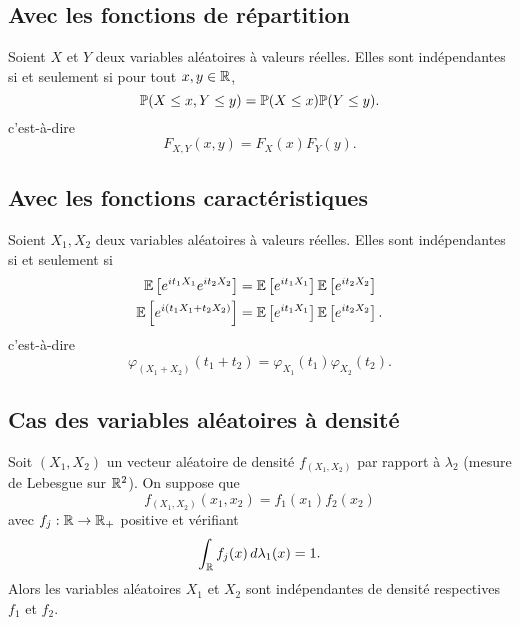 \subsection*{Avec les fonctions de répartition}\label{subsection:fonctions_de_repartition}
\setcounter{subsection}{2}
Soient \(X\) et \(Y\) deux variables aléatoires à valeurs réelles. Elles sont indépendantes
si et seulement si pour tout \(x,y\in\mathbb{R}\),
\begin{equation*}
    \mathbb{P}(X\leq x, Y\leq y) = \mathbb{P}(X\leq x)\mathbb{P}(Y\leq y).
\end{equation*}
c'est-à-dire
\begin{equation*}
    F_{X,Y}(x,y) = F_X(x)F_Y(y).
\end{equation*}

\subsection*{Avec les fonctions caractéristiques}\label{subsection:fonctions_caracteristiques}
\setcounter{subsection}{3}
Soient \(X_1, X_2\) deux variables aléatoires à valeurs réelles. Elles sont indépendantes
si et seulement si
\begin{equation*}
    \begin{aligned}
        \mathbb{E}\left[ e^{it_1X_1}e^{it_2X_2} \right] &= \mathbb{E}\left[ e^{it_1X_1} \right]\mathbb{E}\left[ e^{it_2X_2} \right]\\
        \mathbb{E}\left[ e^{i(t_1X_1+t_2X_2)} \right] &= \mathbb{E}\left[ e^{it_1X_1} \right]\mathbb{E}\left[ e^{it_2X_2} \right].
    \end{aligned}
\end{equation*}
c'est-à-dire
\begin{equation*}
    \varphi_{(X_1+X_2)}(t_1+t_2) = \varphi_{X_1}(t_1)\varphi_{X_2}(t_2).
\end{equation*}

\subsection*{Cas des variables aléatoires à densité}\label{subsection:densite}
\setcounter{subsection}{4}
Soit \((X_1,X_2)\) un vecteur aléatoire de densité \(f_{(X_1,X_2)}\)
par rapport à \(\lambda_2\) (mesure de Lebesgue sur \(\mathbb{R}^2\)). On suppose que
\begin{equation*}
    f_{(X_1,X_2)}(x_1,x_2) = f_1(x_1)f_2(x_2)
\end{equation*}
avec \(f_j:\mathbb{R}\to\mathbb{R}_+\) positive et vérifiant
\begin{equation*}
    \int_{\mathbb{R}} f_j(x)\mathop{}\!{d}\lambda_1(x) = 1.
\end{equation*}
Alors les variables aléatoires \(X_1\) et \(X_2\) sont indépendantes de densité
respectives \(f_1\) et \(f_2\).

